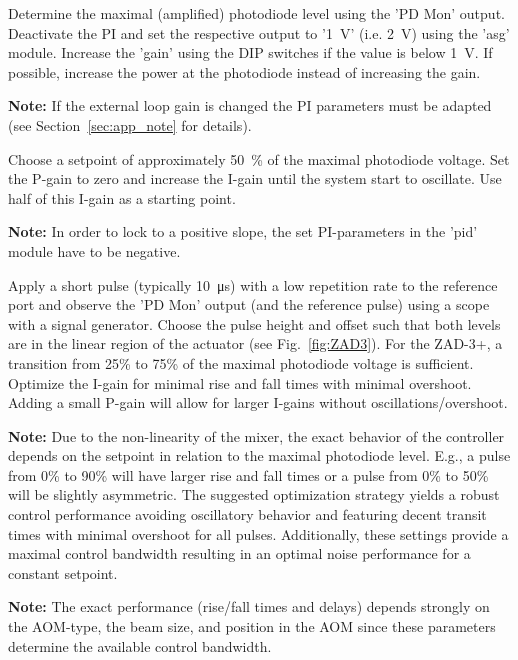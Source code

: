 \documentclass[twoside,a4paper]{refart}
\begin{document}
Determine the maximal (amplified) photodiode level using the 'PD Mon' output. Deactivate the PI and set the respective output to '\SI{1}{\volt}' (i.e. \SI{2}{\volt}) using the 'asg' module. Increase the 'gain' using the DIP switches if the value is below \SI{1}{\volt}. If possible, increase the power at the photodiode instead of increasing the gain. 

\textbf{Note:}
If the external loop gain is changed the PI parameters must be adapted (see Section~\ref{sec:app_note} for details).

Choose a setpoint of approximately \SI{50}{\percent} of the maximal photodiode voltage. Set the P-gain to zero and increase the I-gain until the system start to oscillate. Use half of this I-gain as a starting point.

\textbf{Note:}
In order to lock to a positive slope, the set PI-parameters in the 'pid' module have to be negative.

Apply a short pulse (typically \SI{10}{\micro\second}) with a low repetition rate to the reference port and observe the 'PD Mon' output (and the reference pulse) using a scope with a signal generator. Choose the pulse height and offset such that both levels are in the linear region of the actuator (see Fig.~\ref{fig:ZAD3}). For the ZAD-3+, a transition from 25\% to 75\% of the maximal photodiode voltage is sufficient. Optimize the I-gain for minimal rise and fall times with minimal overshoot. Adding a small P-gain will allow for larger I-gains without oscillations/overshoot.

\textbf{Note:}
Due to the non-linearity of the mixer, the exact behavior of the controller depends on the setpoint in relation to the maximal photodiode level. E.g., a pulse from 0\% to 90\% will have larger rise and fall times or a pulse from 0\% to 50\% will be slightly asymmetric. The suggested optimization strategy yields a robust control performance avoiding oscillatory behavior and featuring decent transit times with minimal overshoot for all pulses. Additionally, these settings provide a maximal control bandwidth resulting in an optimal noise performance for a constant setpoint.

\textbf{Note:}
The exact performance (rise/fall times and delays) depends strongly on the AOM-type, the beam size, and position in the AOM since these parameters determine the available control bandwidth.          
\newpage
\end{document}
